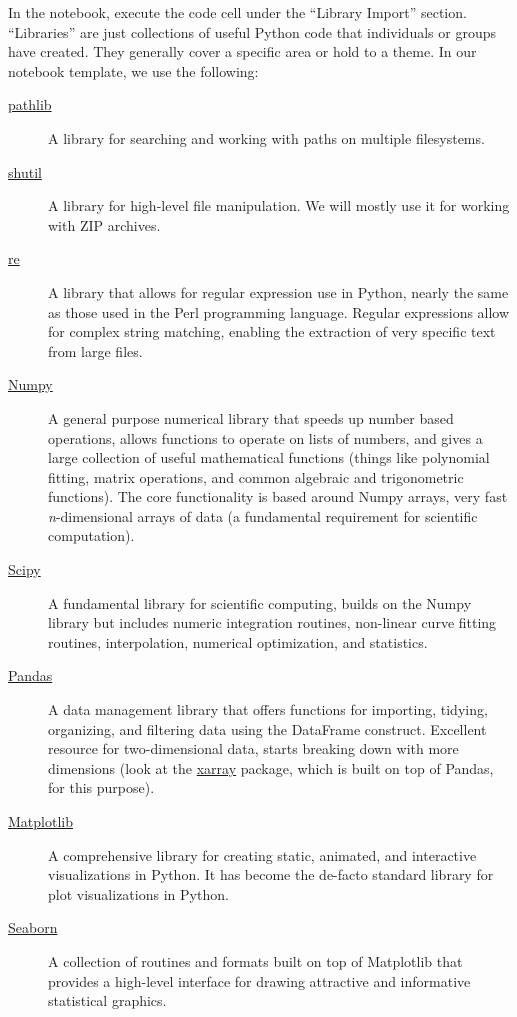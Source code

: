 \documentclass[nobib,nofonts,nols,nohyper]{tufte-handout}
\begin{document}
In the notebook, execute the code cell under the ``Library Import'' section.
``Libraries'' are just collections of useful Python code that individuals or groups have created.
They generally cover a specific area or hold to a theme.
In our notebook template, we use the following:
\begin{description}
  \item[\href{https://docs.python.org/3/library/pathlib.html}{pathlib}] A library
  for searching and working with paths on multiple filesystems.
  \item[\href{https://docs.python.org/3/library/shutil.html}{shutil}] A library
    for high-level file manipulation.
    We will mostly use it for working with ZIP archives.
  \item[\href{https://docs.python.org/3/library/re.html}{re}] A library that
    allows for regular expression use in Python, nearly the same as those used
    in the Perl programming language.
    Regular expressions allow for complex string matching, enabling the
    extraction of very specific text from large files.
  \item[\href{http://numpy.org/}{Numpy}] A general purpose numerical library
    that speeds up number based operations, allows functions to operate on lists
    of numbers, and gives a large collection of useful mathematical functions
    (things like polynomial fitting, matrix operations, and common algebraic and
    trigonometric functions).
    The core functionality is based around Numpy arrays, very fast \emph{n}-dimensional arrays of data (a fundamental requirement for scientific computation).
  \item[\href{https://scipy.org/scipylib/index.html}{Scipy}] A fundamental library for scientific computing, builds on the Numpy library but includes numeric integration routines, non-linear curve fitting routines, interpolation, numerical optimization, and statistics.
  \item[\href{http://pandas.pydata.org/}{Pandas}] A data management library that offers functions for importing, tidying, organizing, and filtering data using the DataFrame construct. Excellent resource for two-dimensional data, starts breaking down with more dimensions (look at the \href{http://xarray.pydata.org/}{xarray} package, which is built on top of Pandas, for this purpose).
  \item[\href{http://matplotlib.org/}{Matplotlib}] A comprehensive library for creating static, animated, and interactive visualizations in Python. It has become the de-facto standard library for plot visualizations in Python.
  \item[\href{https://seaborn.pydata.org}{Seaborn}] A collection of routines and formats built on top of Matplotlib that provides a high-level interface for drawing attractive and informative statistical graphics.
\end{description}
\end{document}

